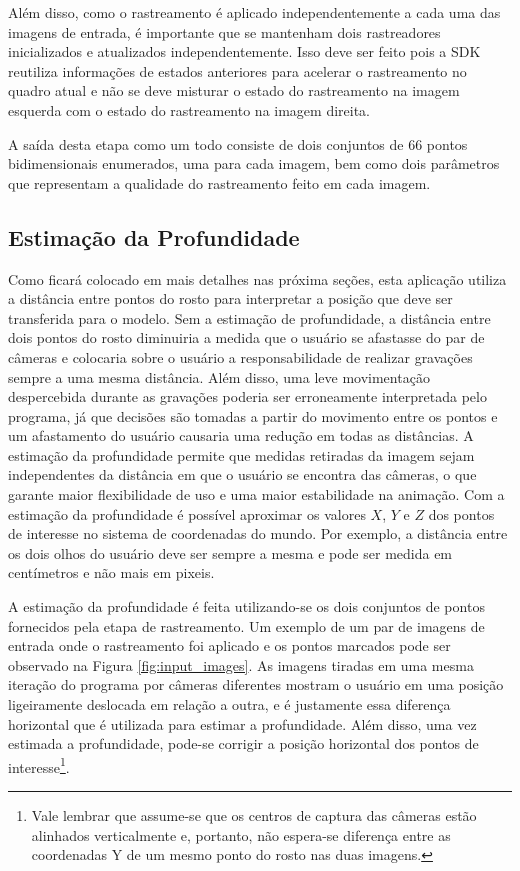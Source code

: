 Além disso, como o rastreamento é aplicado independentemente a cada uma das
imagens de entrada, é importante que se mantenham dois rastreadores
inicializados e atualizados independentemente. Isso deve ser feito pois a SDK
reutiliza informações de estados anteriores para acelerar o rastreamento no
quadro atual e não se deve misturar o estado do rastreamento na imagem esquerda
com o estado do rastreamento na imagem direita. 

A saída desta etapa como um todo consiste de dois conjuntos de 66 pontos
bidimensionais enumerados, uma para cada imagem, bem como dois parâmetros que
representam a qualidade do rastreamento feito em cada imagem. 

\subsection{Estimação da Profundidade}

Como ficará colocado em mais detalhes nas próxima seções, esta aplicação utiliza
a distância entre pontos do rosto para interpretar a posição que deve ser
transferida para o modelo. Sem a estimação de profundidade, a distância entre
dois pontos do rosto diminuiria a medida que o usuário se afastasse do par de
câmeras e colocaria sobre o usuário a responsabilidade de realizar gravações
sempre a uma mesma distância. Além disso, uma leve movimentação despercebida
durante as gravações poderia ser erroneamente interpretada pelo programa, já que
decisões são tomadas a partir do movimento entre os pontos e um afastamento do
usuário causaria uma redução em todas as distâncias.  A estimação da
profundidade permite que medidas retiradas da imagem sejam independentes da
distância em que o usuário se encontra das câmeras, o que garante maior
flexibilidade de uso e uma maior estabilidade na animação. Com a estimação da
profundidade é possível aproximar os valores $X$, $Y$ e $Z$ dos pontos de
interesse no sistema de coordenadas do mundo. Por exemplo, a distância entre os
dois olhos do usuário deve ser sempre a mesma e pode ser medida em centímetros e
não mais em pixeis.

A estimação da profundidade é feita utilizando-se os dois conjuntos de pontos
fornecidos pela etapa de rastreamento. Um exemplo de um par de imagens de
entrada onde o rastreamento foi aplicado e os pontos marcados pode ser observado
na Figura \ref{fig:input_images}. As imagens tiradas em uma mesma iteração do
programa por câmeras diferentes mostram o usuário em  uma posição ligeiramente
deslocada em relação a outra, e é justamente essa diferença horizontal que é
utilizada para estimar a profundidade. Além disso, uma vez estimada a
profundidade, pode-se corrigir a posição horizontal dos pontos de
interesse\footnote{Vale lembrar que assume-se que os centros de captura das
câmeras estão alinhados verticalmente e, portanto, não espera-se diferença entre
as coordenadas Y de um mesmo ponto do rosto nas duas imagens.}.


